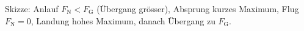 Skizze: Anlauf $F_\text{N} < F_\text{G}$ (Übergang grösser), Absprung kurzes Maximum, Flug $F_\text{N} = 0$, Landung hohes Maximum, danach Übergang zu $F_\text{G}$.
